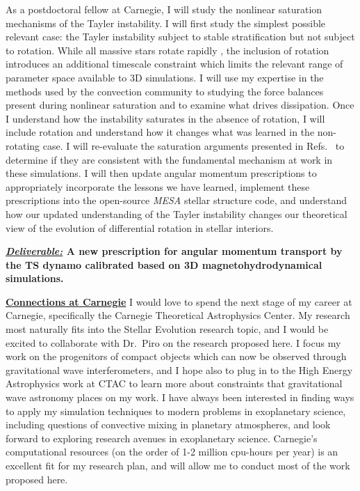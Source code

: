 \documentclass[12pt]{article}
\newcommand{\sct}[1]{\vspace{0.3cm}\hspace{-\parindent}\textbf{\underline{#1}}\hspace{0.3cm}}
\begin{document}
As a postdoctoral fellow at Carnegie, I will study the nonlinear saturation mechanisms of the Tayler instability.
I will first study the simplest possible relevant case: the Tayler instability subject to stable stratification but not subject to rotation.
While all massive stars rotate rapidly \citep{jermyn_etal_2022_atlas}, the inclusion of rotation introduces an additional timescale constraint which limits the relevant range of parameter space available to 3D simulations.
I will use my expertise in the methods used by the convection community \citep{ahlers_etal_2009,aurnou_etal_2020} to studying the force balances present during nonlinear saturation and to examine what drives dissipation.
Once I understand how the instability saturates in the absence of rotation, I will include rotation and understand how it changes what was learned in the non-rotating case.
I will re-evaluate the saturation arguments presented in Refs.~\citep{spruit2002,fuller_etal_2019} to determine if they are consistent with the fundamental mechanism at work in these simulations.
I will then update angular momentum prescriptions to appropriately incorporate the lessons we have learned, implement these prescriptions into the open-source \emph{MESA} stellar structure code, and understand how our updated understanding of the Tayler instability changes our theoretical view of the evolution of differential rotation in stellar interiors.

\textbf{\underline{\emph{Deliverable:}} A new prescription for angular momentum transport by the TS dynamo calibrated based on 3D magnetohydrodynamical simulations.}

\sct{Connections at Carnegie}
I would love to spend the next stage of my career at Carnegie, specifically the Carnegie Theoretical Astrophysics Center.
My research most naturally fits into the Stellar Evolution research topic, and I would be excited to collaborate with Dr.~Piro on the research proposed here.
I focus my work on the progenitors of compact objects which can now be observed through gravitational wave interferometers, and I hope also to plug in to the High Energy Astrophysics work at CTAC to learn more about constraints that gravitational wave astronomy places on my work.
I have always been interested in finding ways to apply my simulation techniques to modern problems in exoplanetary science, including questions of convective mixing in planetary atmospheres, and look forward to exploring research avenues in exoplanetary science.
Carnegie's computational resources (on the order of 1-2 million cpu-hours per year) is an excellent fit for my research plan, and will allow me to conduct most of the work proposed here.
\end{document}
